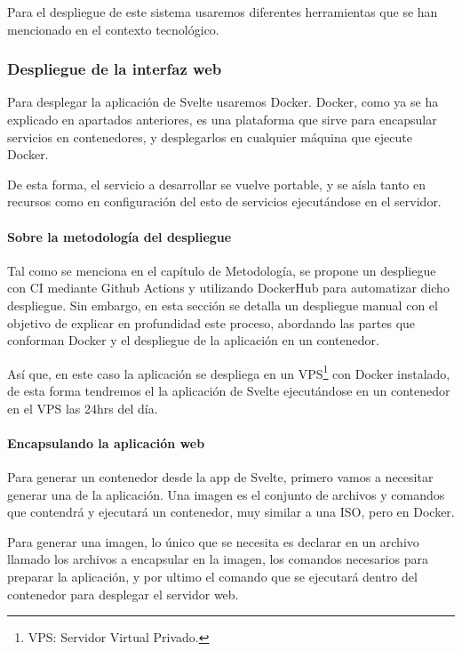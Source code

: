 \bigskip

Para el despliegue de este sistema usaremos diferentes herramientas que se han mencionado en el contexto tecnológico.

\subsubsection{Despliegue de la interfaz web}

Para desplegar la aplicación de Svelte usaremos Docker. Docker, como ya se ha explicado en apartados anteriores, es una plataforma que sirve para encapsular servicios en contenedores, y desplegarlos en cualquier máquina que ejecute Docker.

\bigskip

De esta forma, el servicio a desarrollar se vuelve portable, y se aísla tanto en recursos como en configuración del esto de servicios ejecutándose en el servidor.

\bigskip

\paragraph{Sobre la metodología del despliegue}

Tal como se menciona en el capítulo de Metodología, se propone un despliegue con CI mediante Github Actions y utilizando DockerHub para automatizar dicho despliegue. Sin embargo, en esta sección se detalla un despliegue manual con el objetivo de explicar en profundidad este proceso, abordando las partes que conforman Docker y el despliegue de la aplicación en un contenedor.

\bigskip

Así que, en este caso la aplicación se despliega en un VPS\footnote{VPS: Servidor Virtual Privado.} con Docker instalado, de esta forma tendremos el la aplicación de Svelte ejecutándose en un contenedor en el VPS las 24hrs del día.
\paragraph{Encapsulando la aplicación web}

Para generar un contenedor desde la app de Svelte, primero vamos a necesitar generar una  de la aplicación. Una imagen es el conjunto de archivos y comandos que contendrá y ejecutará un contenedor, muy similar a una ISO, pero en Docker.

\newpage

Para generar una imagen, lo único que se necesita es declarar en un archivo llamado  los archivos a encapsular en la imagen, los comandos necesarios para preparar la aplicación, y por ultimo el comando que se ejecutará dentro del contenedor para desplegar el servidor web.

